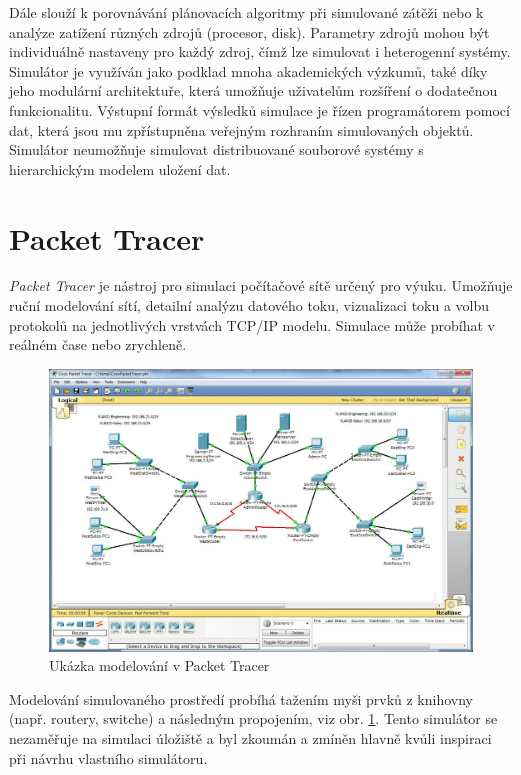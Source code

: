 \documentclass[czech,DP]{thesiskiv}
\begin{document}
Dále slouží k porovnávání plánovacích algoritmy při simulované zátěži nebo k analýze zatížení různých zdrojů (procesor, disk). Parametry zdrojů mohou být individuálně nastaveny pro každý zdroj, čímž lze simulovat i heterogenní systémy. Simulátor je využíván jako podklad mnoha akademických výzkumů, také díky jeho modulární architektuře, která umožňuje uživatelům rozšíření o dodatečnou funkcionalitu. Výstupní formát výsledků simulace je řízen programátorem pomocí dat, která jsou mu zpřístupněna veřejným rozhraním simulovaných objektů. Simulátor neumožňuje simulovat distribuované souborové systémy s hierarchickým modelem uložení dat.

\section{Packet Tracer}

\textit{Packet Tracer} \cite{packettracerpaper} je nástroj pro simulaci počítačové sítě určený pro výuku. Umožňuje ruční modelování sítí, detailní analýzu datového toku, vizualizaci toku a volbu protokolů na jednotlivých vrstvách TCP/IP modelu. Simulace může probíhat v reálném čase nebo zrychleně.

\begin{figure}[H]
\centering
	\includegraphics[width=\textwidth]{img/packet_tracer.jpg}
\caption{Ukázka modelování v Packet Tracer}
\label{fig:packet_tracer}
\end{figure}

Modelování simulovaného prostředí probíhá tažením myši prvků z knihovny (např. routery, switche) a následným propojením, viz obr. \ref{fig:packet_tracer}. Tento simulátor se nezaměřuje na simulaci úložiště a byl zkoumán a zmíněn hlavně kvůli inspiraci při návrhu vlastního simulátoru.
\end{document}
